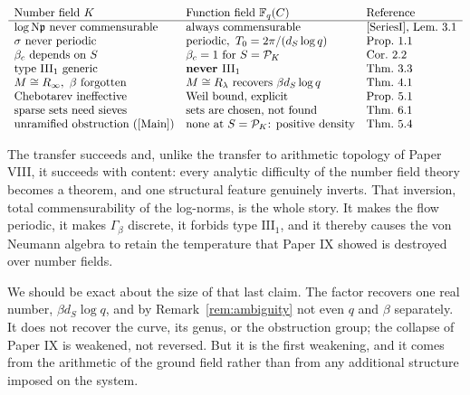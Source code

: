 \documentclass[11pt]{amsart}
\numberwithin{equation}{section}
\theoremstyle{definition}
\theoremstyle{remark}
\newcommand{\F}{\mathbb{F}}
\newcommand{\cP}{\mathcal{P}}
\newcommand{\pp}{\mathfrak{p}}
\newcommand{\Ns}{\mathrm{N}}
\begin{document}
\[
\begin{array}{lll}
\text{Number field }K & \text{Function field }\F_q(C) & \text{Reference}\\\hline
\log\Ns\pp\ \text{never commensurable} & \text{always commensurable} & \text{\cite[Lem.~4.1]{SeriesI}, Lem.~3.1}\\
\sigma\ \text{never periodic} & \text{periodic},\ T_0=2\pi/(d_S\log q) & \text{Prop.~1.1}\\
\beta_c\ \text{depends on }S & \beta_c=1\ \text{for }S=\cP_K & \text{Cor.~2.2}\\
\text{type }\mathrm{III}_1\ \text{generic} & \textbf{never }\mathrm{III}_1 & \text{Thm.~3.3}\\
M\cong R_\infty,\ \beta\ \text{forgotten} & M\cong R_\lambda\ \text{recovers}\ \beta d_S\log q & \text{Thm.~4.1}\\
\text{Chebotarev ineffective} & \text{Weil bound, explicit} & \text{Prop.~5.1}\\
\text{sparse sets need sieves} & \text{sets are chosen, not found} & \text{Thm.~6.1}\\
\text{unramified obstruction (\cite[\S4.1]{Main})} & \text{none at }S=\cP_K\text{: positive density} & \text{Thm.~5.4}
\end{array}
\]

The transfer succeeds and, unlike the transfer to arithmetic topology of Paper VIII,
it succeeds with content: every analytic difficulty of the number field theory becomes a
theorem, and one structural feature genuinely inverts. That inversion, total commensurability
of the log-norms, is the whole story. It makes the flow periodic, it makes $\Gamma_\beta$
discrete, it forbids type $\mathrm{III}_1$, and it thereby causes the von Neumann algebra to
retain the temperature that Paper IX showed is destroyed over number fields.

We should be exact about the size of that last claim. The factor recovers one real number,
$\beta d_S\log q$, and by Remark~\ref{rem:ambiguity} not even $q$ and $\beta$ separately. It
does not recover the curve, its genus, or the obstruction group; the collapse of
Paper IX is weakened, not reversed. But it is the first weakening, and it comes from
the arithmetic of the ground field rather than from any additional structure imposed on the
system.
\end{document}
